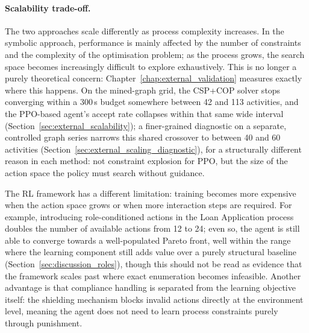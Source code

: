 \paragraph{Scalability trade-off.} The two approaches scale differently as process complexity increases. In the symbolic approach, performance is mainly affected by the number of constraints and the complexity of the optimisation problem; as the process grows, the search space becomes increasingly difficult to explore exhaustively. This is no longer a purely theoretical concern: Chapter~\ref{chap:external_validation} measures exactly where this happens. On the mined-graph grid, the CSP+COP solver stops converging within a 300\,s budget somewhere between 42 and 113 activities, and the \ac{PPO}-based agent's accept rate collapses within that same wide interval (Section~\ref{sec:external_scalability}); a finer-grained diagnostic on a separate, controlled graph series narrows this shared crossover to between 40 and 60 activities (Section~\ref{sec:external_scaling_diagnostic}), for a structurally different reason in each method: not constraint explosion for \ac{PPO}, but the size of the action space the policy must search without guidance.

The \ac{RL} framework has a different limitation: training becomes more expensive when the action space grows or when more interaction steps are required. For example, introducing role-conditioned actions in the Loan Application process doubles the number of available actions from 12 to 24; even so, the agent is still able to converge towards a well-populated Pareto front, well within the range where the learning component still adds value over a purely structural baseline (Section~\ref{sec:discussion_roles}), though this should not be read as evidence that the framework scales past where exact enumeration becomes infeasible. Another advantage is that compliance handling is separated from the learning objective itself: the shielding mechanism blocks invalid actions directly at the environment level, meaning the agent does not need to learn process constraints purely through punishment.

